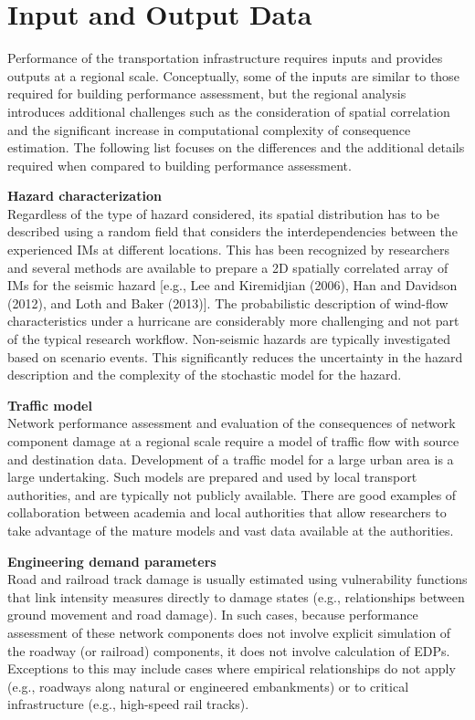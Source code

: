 \section{Input and Output Data}
\label{sec:perf_transport_io}

Performance of the transportation infrastructure requires inputs and provides outputs at a regional scale. Conceptually, some of the inputs are similar to those required for building performance assessment, but the regional analysis introduces additional challenges such as the consideration of spatial correlation and the significant increase in computational complexity of consequence estimation. The following list focuses on the differences and the additional details required when compared to building performance assessment.
\newline

\noindent\textbf{Hazard characterization} \\Regardless of the type of hazard considered, its spatial distribution has to be described using a random field that considers the interdependencies between the experienced IMs at different locations. This has been recognized by researchers and several methods are available to prepare a 2D spatially correlated array of IMs for the seismic hazard [e.g., Lee and Kiremidjian (2006), Han and Davidson (2012), and Loth and Baker (2013)]. The probabilistic description of wind-flow characteristics under a hurricane are considerably more challenging and not part of the typical research workflow. Non-seismic hazards are typically investigated based on scenario events. This significantly reduces the uncertainty in the hazard description and the complexity of the stochastic model for the hazard.
\newline

\noindent\textbf{Traffic model} \\Network performance assessment and evaluation of the consequences of network component damage at a regional scale require a model of traffic flow with source and destination data. Development of a traffic model for a large urban area is a large undertaking. Such models are prepared and used by local transport authorities, and are typically not publicly available. There are good examples of collaboration between academia and local authorities that allow researchers to take advantage of the mature models and vast data available at the authorities.
\newline

\noindent\textbf{Engineering demand parameters} \\Road and railroad track damage is usually estimated using vulnerability functions that link intensity measures directly to damage states (e.g., relationships between ground movement and road damage). In such cases, because performance assessment of these network components does not involve explicit simulation of the roadway (or railroad) components, it does not involve calculation of EDPs. Exceptions to this may include cases where empirical relationships do not apply (e.g., roadways along natural or engineered embankments) or to critical infrastructure (e.g., high-speed rail tracks).

